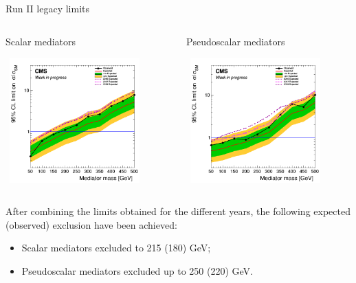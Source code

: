 \documentclass[8pt]{beamer}
\begin{document}
\begin{frame}{Run II legacy limits}
\justifying
\begin{columns}
	\begin{column}{0.5 \textwidth}
\begin{center}
\begin{block}{\centering Scalar mediators}\end{block} \vspace{-10pt}
\includegraphics[width=5.4cm, height=4.8cm]{figs/limit_scalar.png}
\end{center}
\end{column}
	\begin{column}{0.5 \textwidth}
\begin{figure}[htbp]
\begin{center}
\begin{block}{\centering Pseudoscalar mediators}\end{block} \vspace{-8pt}
\includegraphics[width=5.4cm, height=4.8cm]{figs/limit_pseudo.png}
\end{center}
\end{figure}
	\end{column}
	\end{columns} \vfill
	
After combining the limits obtained for the different years, the following \alert{expected (observed) exclusion have been achieved}:
\begin{itemize}
\item Scalar mediators excluded to 215 (180) GeV;
\item Pseudoscalar mediators excluded up to 250 (220) GeV. 
\end{itemize} \vfill
\end{frame}
\end{document}
